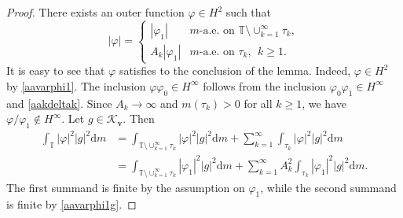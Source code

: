 \documentclass[10pt,a4paper]{amsart}
\begin{document}
\begin{proof}
There exists an outer function $\varphi\in H^2$ such that $$|\varphi|=\begin{cases} |\varphi_1| & m\text{-a.e. on } 
\mathbb T\setminus\cup_{k=1}^\infty \tau_k, \\ 
A_k|\varphi_1|&  m\text{-a.e. on } \tau_k, \ \ k\geq 1.\end{cases}$$ 
It is easy to see that $\varphi$ satisfies to the conclusion of the lemma. 
Indeed, $\varphi\in H^2$ by \eqref{aavarphi1}. 
The inclusion $\varphi\varphi_0\in H^\infty$ follows from   the inclusion $\varphi_0\varphi_1\in H^\infty$ and \eqref{aakdeltak}. Since $A_k\to\infty$ and  $m(\tau_k)>0$ for all $k\geq 1$, we have 
$\varphi/\varphi_1\not\in H^\infty$. 
Let $g\in\mathcal K_{\mathbf v}$. Then
\begin{equation*}\begin{aligned}\int_{\mathbb T}|\varphi|^2|g|^2{\mathrm d}m &
 =\int_{\mathbb T\setminus\cup_{k=1}^\infty \tau_k}|\varphi|^2|g|^2{\mathrm d}m+
\sum_{k=1}^\infty \int_{\tau_k}|\varphi|^2|g|^2{\mathrm d}m\\&=
\int_{\mathbb T\setminus\cup_{k=1}^\infty \tau_k}|\varphi_1|^2|g|^2{\mathrm d}m+
\sum_{k=1}^\infty A_k^2 \int_{\tau_k}|\varphi_1|^2|g|^2{\mathrm d}m.\end{aligned}\end{equation*}
The first summand is finite by the assumption on $\varphi_1$, while the second summand is finite by \eqref{aavarphi1g}.
\end{proof}
\end{document}
